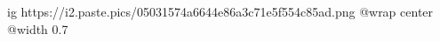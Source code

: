  
 
 
 
 

\ifcmt
  ig https://i2.paste.pics/05031574a6644e86a3c71e5f554c85ad.png
	@wrap center
	@width 0.7
\fi
